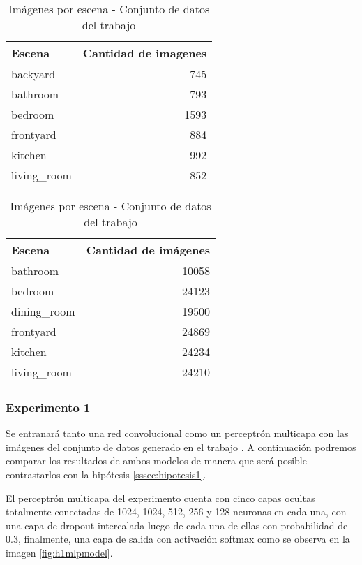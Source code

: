 \begin{table}[h!]
	\centering
	\begin{tabular}{| l | r | }
		\toprule
		Escena &  Cantidad de imagenes \\
		\midrule
		backyard &       745 \\
		bathroom &       793 \\
		bedroom &      1593 \\
		frontyard &       884 \\
		kitchen &       992 \\
		living\_room &       852 \\
		\bottomrule
	\end{tabular}
	\caption{Imágenes por escena - Conjunto de datos del trabajo \cite{lstm_real_estate}}
	\label{exp:distribution_rei}
\end{table}

\begin{table}[h!]
	\centering
	\begin{tabular}{| l | r | }
		\toprule
		Escena &  Cantidad de imágenes \\
		\midrule
		bathroom & 10058 \\
		bedroom & 24123 \\
		dining\_room & 19500 \\
		frontyard & 24869 \\
		kitchen & 24234 \\
		living\_room & 24210 \\
		\bottomrule
	\end{tabular}
	\caption{Imágenes por escena - 	Conjunto de datos del trabajo \cite{vision_based_real_estate_price_estimation}}
	\label{exp:distribution_vision_based}
\end{table}

\subsubsection{Experimento 1} \label{sssec:exp1}
Se entranará tanto una red convolucional como un perceptrón multicapa con las imágenes del conjunto de datos generado en el trabajo \cite{vision_based_real_estate_price_estimation}. A continuación podremos comparar los resultados de ambos modelos de manera que será posible contrastarlos con la hipótesis \ref{sssec:hipotesis1}.

El perceptrón multicapa del experimento cuenta con cinco capas ocultas totalmente conectadas de 1024, 1024, 512, 256 y 128 neuronas en cada una, con una capa de dropout intercalada luego de cada una de ellas con probabilidad de 0.3, finalmente, una capa de salida con activación softmax como se observa en la imagen \ref{fig:h1mlpmodel}. 



